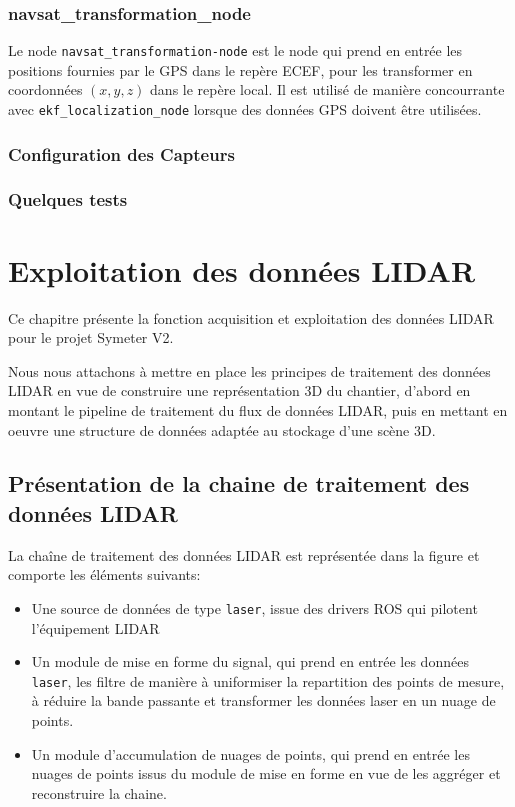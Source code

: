\documentclass[12pt,a4paper]{report}
\begin{document}
	\subsection{navsat\_transformation\_node}
	Le node \verb|navsat_transformation-node| est le node qui prend en entrée les positions fournies par le GPS dans le repère ECEF, pour les transformer en coordonnées $(x,y,z)$ dans le repère local. Il est utilisé de manière concourrante avec \verb|ekf_localization_node| lorsque des données GPS doivent être utilisées.
	
	\subsection{Configuration des Capteurs}
	
	\subsection{Quelques tests}
	
	
\chapter{Exploitation des données LIDAR}

Ce chapitre présente la fonction acquisition et exploitation des données LIDAR pour le projet Symeter V2. 

\para Nous nous attachons à mettre en place les principes de traitement des données LIDAR en vue de construire une représentation 3D du chantier, d'abord en montant le pipeline de traitement du flux de données LIDAR, puis en mettant en oeuvre une structure de données adaptée au stockage d'une scène 3D.

	\section{Présentation de la chaine de traitement des données LIDAR}
	
	La chaîne de traitement des données LIDAR est représentée dans la figure  et comporte les éléments suivants:
	\begin{itemize}
		\item Une source de données de type \verb|laser|, issue des drivers ROS qui pilotent l'équipement LIDAR
		
		\item Un module de mise en forme du signal, qui prend en entrée les données \verb|laser|, les filtre de manière à uniformiser la repartition des points de mesure, à réduire la bande passante et transformer les données laser en un nuage de points.
		
		\item Un module d'accumulation de nuages de points, qui prend en entrée les nuages de points issus du module de mise en forme en vue de les aggréger et reconstruire la chaine.
	\end{itemize}
	
\end{document}
